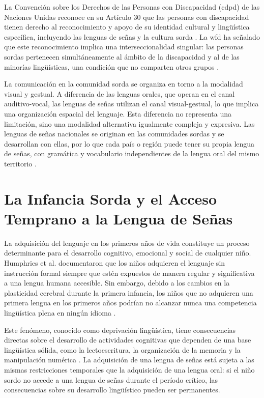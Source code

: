 La Convención sobre los Derechos de las Personas con Discapacidad (\acrshort{cdpd}) de las
Naciones Unidas reconoce en su Artículo 30 que las personas con discapacidad tienen
derecho al reconocimiento y apoyo de su identidad cultural y lingüística específica,
incluyendo las lenguas de señas y la cultura sorda \cite{onu_cdpd_2006}. La \acrshort{wfd} ha señalado que este
reconocimiento implica una interseccionalidad singular: las personas sordas pertenecen
simultáneamente al ámbito de la discapacidad y al de las minorías lingüísticas, una
condición que no comparten otros grupos \cite{wfd_sign_language_rights_2024}.

La comunicación en la comunidad sorda se organiza en torno a la modalidad visual y
gestual. A diferencia de las lenguas orales, que operan en el canal auditivo-vocal, las
lenguas de señas utilizan el canal visual-gestual, lo que implica una organización espacial
del lenguaje. Esta diferencia no representa una limitación, sino una modalidad alternativa
igualmente compleja y expresiva. Las lenguas de señas nacionales se originan en las
comunidades sordas y se desarrollan con ellas, por lo que cada país o región puede tener
su propia lengua de señas, con gramática y vocabulario independientes de la lengua oral
del mismo territorio \cite{wfd_primacy_2024}.

\section{La Infancia Sorda y el Acceso Temprano a la Lengua de Señas}

La adquisición del lenguaje en los primeros años de vida constituye un proceso
determinante para el desarrollo cognitivo, emocional y social de cualquier niño. Humphries
et al. documentaron que los niños adquieren el lenguaje sin instrucción formal siempre que
estén expuestos de manera regular y significativa a una lengua humana accesible. Sin
embargo, debido a los cambios en la plasticidad cerebral durante la primera infancia, los
niños que no adquieren una primera lengua en los primeros años podrían no alcanzar nunca
una competencia lingüística plena en ningún idioma \cite{humphries_language_2012}.

Este fenómeno, conocido como deprivación lingüística, tiene consecuencias directas sobre
el desarrollo de actividades cognitivas que dependen de una base lingüística sólida, como
la lectoescritura, la organización de la memoria y la manipulación numérica \cite{humphries_language_2012}. La
adquisición de una lengua de señas está sujeta a las mismas restricciones temporales que
la adquisición de una lengua oral: si el niño sordo no accede a una lengua de señas durante
el período crítico, las consecuencias sobre su desarrollo lingüístico pueden ser permanentes.

